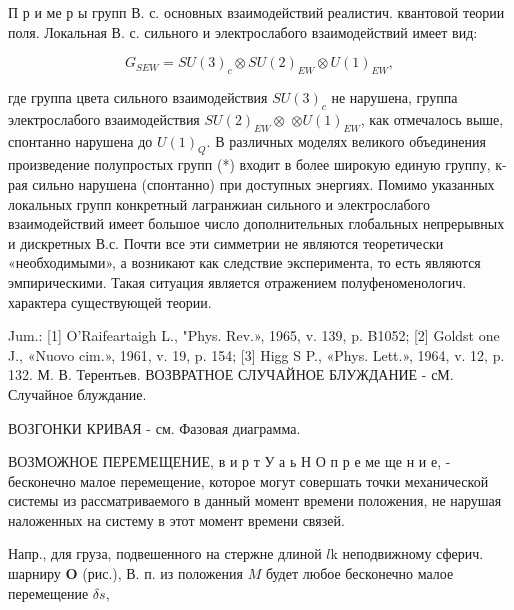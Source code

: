 \documentclass[10pt]{article}
\begin{document}
П р и ме р ы групп В. с. основных взаимодействий реалистич. квантовой теории поля. Локальная В. с. сильного и электрослабого взаимодействий имеет вид:



\[

G_{S E W}=S U(3)_{c} \otimes S U(2)_{E W} \otimes U(1)_{E W},

\]



где группа цвета сильного взаимодействия $S U(3)_{c}$ не нарушена, группа электрослабого взаимодействия $S U(2)_{E W} \otimes$ $\otimes U(1)_{E W}$, как отмечалось выше, спонтанно нарушена до $U(1)_{Q}$. В различных моделях великого объединения произведение полупростых групп (*) входит в более широкую единую группу, к-рая сильно нарушена (спонтанно) при доступных энергиях. Помимо указанных локальных групп конкретный лагранжиан сильного и электрослабого взаимодействий имеет большое число дополнительных глобальных непрерывных и дискретных В.с. Почти все эти симметрии не являются теоретически «необходимыми», а возникают как следствие эксперимента, то есть являются эмпирическими. Такая ситуация является отражением полуфеноменологич. характера существующей теории.



Jum.: [1] O'Raifeartaigh L., "Phys. Rev.», 1965, v. 139, p. B1052; [2] Goldst one J., «Nuovo cim.», 1961, v. 19, p. 154; [3] Higg S P., «Phys. Lett.», 1964, v. 12, p. 132. М. В. Терентьев. ВОЗВРАТНОЕ СЛУЧАЙНОЕ БЛУЖДАНИЕ - сМ. Случайное блуждание.



ВОЗГОНКИ КРИВАЯ - см. Фазовая диаграмма.



ВОЗМОЖНОЕ ПЕРЕМЕЩЕНИЕ, в и р т У а ь Н О п р е ме ще н и е, - бесконечно малое перемещение, которое могут совершать точки механической системы из рассматриваемого в данный момент времени положения, не нарушая наложенных на систему в этот момент времени связей.



Напр., для груза, подвешенного на стержне длиной $l \mathrm{k}$ неподвижному сферич. шарниру $\boldsymbol{O}$ (рис.), В. п. из положения $M$ будет любое бесконечно малое перемещение $\delta s$,
\end{document}

